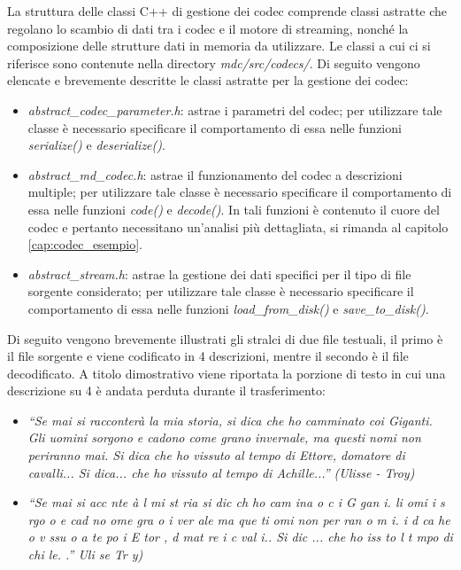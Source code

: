 La struttura delle classi C++ di gestione dei codec comprende classi astratte
che regolano lo scambio di dati tra i codec e il motore di streaming, nonché la
composizione delle strutture dati in memoria da utilizzare. Le classi a cui ci si riferisce sono contenute nella directory \textit{mdc/src/codecs/}. Di
seguito vengono elencate e brevemente descritte le classi astratte per la
gestione dei codec:
\begin{itemize}
 \item \textit{abstract\_codec\_parameter.h}: astrae i parametri del codec; per
 utilizzare tale classe è necessario specificare il comportamento di essa nelle
 funzioni \textit{serialize()} e \textit{deserialize()}.
 \item \textit{abstract\_md\_codec.h}: astrae il funzionamento del codec a
 descrizioni multiple; per utilizzare tale classe è necessario specificare il
 comportamento di essa nelle funzioni \textit{code()} e \textit{decode()}. In
 tali funzioni è contenuto il cuore del codec e pertanto necessitano un'analisi
 più dettagliata, si rimanda al capitolo \ref{cap:codec_esempio}.
 \item \textit{abstract\_stream.h}: astrae la gestione dei dati specifici per il
 tipo di file sorgente considerato; per utilizzare tale classe è necessario
 specificare il comportamento di essa nelle funzioni \textit{load\_from\_disk()}
 e \textit{save\_to\_disk()}.
\end{itemize}

Di seguito vengono brevemente illustrati gli stralci di due file
testuali, il primo è il file sorgente e viene codificato in 4 descrizioni,
mentre il secondo è il file decodificato. A titolo dimostrativo viene riportata
la porzione di testo in cui una descrizione su 4 è andata perduta durante il
trasferimento:

\begin{itemize}
  \item \emph{``Se mai si racconterà la mia storia, si dica che ho camminato
  coi Giganti. Gli uomini sorgono e cadono come grano invernale, ma questi nomi non periranno mai. Si dica che ho vissuto al tempo di Ettore, domatore di cavalli... Si dica... che ho vissuto al tempo di Achille...'' (Ulisse - Troy)}
  \item \emph{``Se mai si  acc nte à l  mi  st ria  si dic  ch  ho cam ina o c
  i G gan i.  li  omi i s rgo o e cad no  ome gra o i ver ale  ma que ti  omi  
  non per ran o m i.  i d ca  he  o v ssu o a  te po  i E tor , d mat re  i
  c val i..  Si dic ... che ho  iss to  l t mpo di  chi le. .''  Uli se   Tr y)}
\end{itemize}

